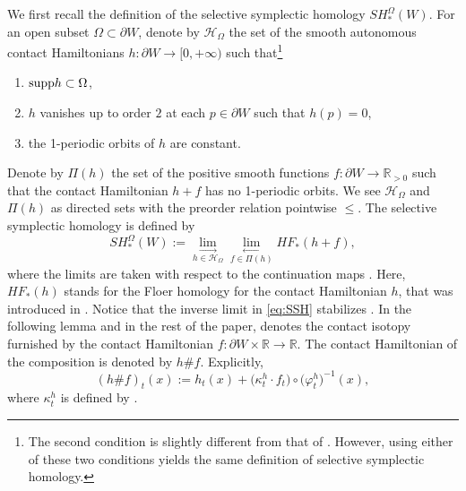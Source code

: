 \documentclass[10pt,a4paper]{amsart}
\numberwithin{equation}{section}
\theoremstyle{definition}
\begin{document}
 We first recall the definition of the selective symplectic homology $SH_\ast^\Omega(W)$. For an open subset $\Omega\subset \partial W$, denote by $\mathcal{H}_\Omega$ the set of the smooth autonomous contact Hamiltonians $h\colon \partial W\to[0,+\infty)$ such that\footnote{The second condition is slightly different from that of \cite[Definition~3.1]{uljarevic2023selective}. However, using either of these two conditions yields the same definition of selective symplectic homology.}
 \begin{enumerate}\itemsep=0pt
 \item[(1)] ${\rm supp} h \subset \Omega$,
 \item[(2)] $h$ vanishes up to order $2$ at each $p\in\partial W$ such that $h(p)=0$,
 \item[(3)] the 1-periodic orbits of $h$ are constant.
 \end{enumerate}

 Denote by $\Pi(h)$ the set of the positive smooth functions $f\colon \partial W\to\mathbb{R}_{{>}0}$ such that the contact Hamiltonian $h+f$ has no 1-periodic orbits. {We see $\mathcal{H}_\Omega$ and $\Pi(h)$ as directed sets with the preorder relation pointwise $\leqslant$.} The selective symplectic homology is defined by
 \begin{equation}\label{eq:SSH} SH_\ast^\Omega(W):= \underset{h\in\mathcal{H}_\Omega}{\lim_{\longrightarrow}} \underset{f\in\Pi(h)}{\lim_{\longleftarrow}} HF_\ast(h+f),\end{equation}
 where the limits are taken with respect to the continuation maps {\cite[Section~4]{merry2019maximum}}. Here, $HF_\ast(h)$ stands for the Floer homology for the contact Hamiltonian $h$, that was introduced in \cite{merry2019maximum}. Notice that the inverse limit in \eqref{eq:SSH} stabilizes \cite[Lemma~3.5]{uljarevic2023selective}. In the following lemma and in the rest of the paper,  denotes the contact isotopy furnished by the contact Hamiltonian $f\colon\partial W\times\mathbb{R}\to\mathbb{R}$. {The contact Hamiltonian of the composition  is denoted by $h\# f$. Explicitly,
 \[ (h\# f)_t(x):= h_t(x) + \bigl(\kappa_t^h\cdot f_t\bigr)\circ\bigl(\varphi^h_t\bigr)^{-1}(x), \]
 where $\kappa^h_t$ is defined by .}
\end{document}
